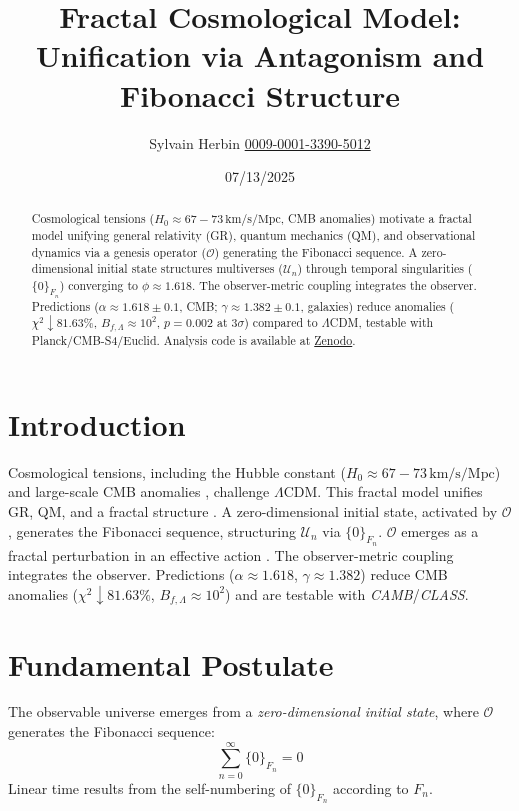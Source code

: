 \documentclass[aps,prl,twocolumn,groupedaddress]{revtex4-2}
\newcommand{\F}[1]{F_{#1}}
\newcommand{\U}[1]{\mathcal{U}_{#1}}
\newcommand{\phiapprox}{\phi \approx 1.618}
\newcommand{\Opp}{\mathcal{O}}
\newcommand{\presets}{\{0\}_{\F{n}}}
\begin{document}
\title{Fractal Cosmological Model: Unification via Antagonism and Fibonacci Structure}
\author{Sylvain Herbin \href{https://orcid.org/0009-0001-3390-5012}{0009-0001-3390-5012}}
\date{07/13/2025}

\begin{abstract}
Cosmological tensions (\(H_0 \approx 67-73 \, \text{km/s/Mpc}\), CMB anomalies) motivate a fractal model unifying general relativity (GR), quantum mechanics (QM), and observational dynamics via a genesis operator (\(\Opp\)) generating the Fibonacci sequence. A zero-dimensional initial state structures multiverses (\(\U{n}\)) through temporal singularities (\(\presets\)) converging to \(\phiapprox\). The observer-metric coupling integrates the observer. Predictions (\(\alpha \approx 1.618 \pm 0.1\), CMB; \(\gamma \approx 1.382 \pm 0.1\), galaxies) reduce anomalies (\(\chi^2 \downarrow 81.63\%\), \(B_{f,\Lambda} \approx 10^2\), \(p = 0.002\) at \(3\sigma\)) compared to \(\Lambda\)CDM, testable with Planck/CMB-S4/Euclid. Analysis code is available at \href{https://doi.org/10.5281/zenodo.15863407}{Zenodo}.
\end{abstract}

\maketitle

\section{Introduction}
Cosmological tensions, including the Hubble constant (\(H_0 \approx 67-73 \, \text{km/s/Mpc}\)) \cite{divalentino2021} and large-scale CMB anomalies \cite{planck}, challenge \(\Lambda\)CDM. This fractal model unifies GR, QM, and a fractal structure \cite{nottale}. A zero-dimensional initial state, activated by \(\Opp\), generates the Fibonacci sequence, structuring \(\U{n}\) via \(\presets\). \(\Opp\) emerges as a fractal perturbation in an effective action \cite{chernsimons}. The observer-metric coupling \cite{zeh,zurek} integrates the observer. Predictions (\(\alpha \approx 1.618\), \(\gamma \approx 1.382\)) reduce CMB anomalies (\(\chi^2 \downarrow 81.63\%\), \(B_{f,\Lambda} \approx 10^2\)) and are testable with \textit{CAMB}/\textit{CLASS}.

\section{Fundamental Postulate}
The observable universe emerges from a \emph{zero-dimensional initial state}, where \(\Opp\) generates the Fibonacci sequence:
\begin{equation}
\sum_{n=0}^\infty \presets = 0
\label{eq:sum_zero}
\end{equation}
Linear time results from the self-numbering of \(\presets\) according to \(\F{n}\).
\end{document}
